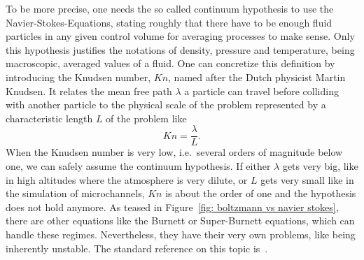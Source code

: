 To be more precise, one needs the so called continuum hypothesis to use the Navier-Stokes-Equations, stating roughly that there have to be enough fluid particles in any given control volume for averaging processes to make sense.
Only this hypothesis justifies the notations of density, pressure and temperature, being macroscopic, averaged values of a fluid.
One can concretize this definition by introducing the Knudsen number, $Kn$, named after the Dutch physicist Martin Knudsen.
It relates the mean free path $\lambda$ a particle can travel before colliding with another particle to the physical scale of the problem represented by a characteristic length $L$ of the problem like
\begin{equation}
  \label{eq: definition of knudsen number}
  Kn=\frac{\lambda}{L}.
\end{equation}
When the Knudsen number is very low, i.e.\ several orders of magnitude below one, we can safely assume the continuum hypothesis.
If either $\lambda$ gets very big, like in high altitudes where the atmosphere is very dilute, or $L$ gets very small like in the simulation of microchannels, $Kn$ is about the order of one and the hypothesis does not hold anymore.
As teased in Figure~\ref{fig: boltzmann vs navier stokes}, there are other equations like the Burnett or Super-Burnett equations, which can handle these regimes.
Nevertheless, they have their very own problems, like being inherently unstable.
The standard reference on this topic is~\cite{agarwal2001beyond}.
